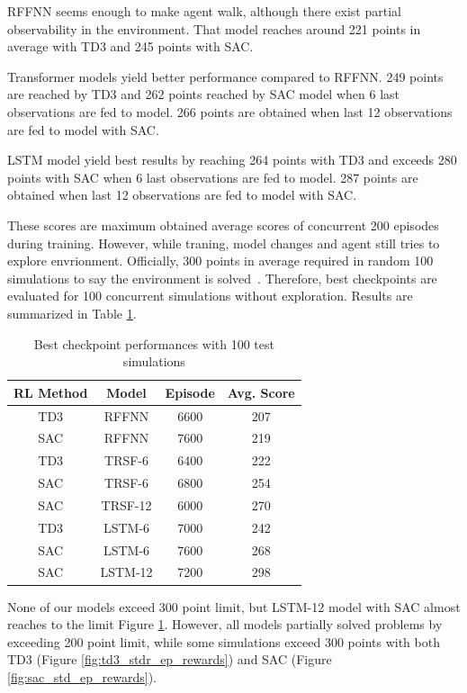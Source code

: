 \documentclass[a4paper, 12pt]{article} %
\begin{document}
RFFNN seems enough to make agent walk, although there exist partial observability in the environment. 
That model reaches around 221 points in average with TD3 and 245 points with SAC. 

Transformer models yield better performance compared to RFFNN. 249 points are reached by TD3 and 262 points reached by SAC model when 6 last observations are fed to model. 266 points are obtained when last 12 observations are fed to model with SAC.

LSTM model yield best results by reaching 264 points with TD3 and exceeds 280 points with SAC when 6 last observations are fed to model. 287 points are obtained when last 12 observations are fed to model with SAC. 

These scores are maximum obtained average scores of concurrent 200 episodes during training. 
However, while traning, model changes and agent still tries to explore envrionment. 
Officially, 300 points in average required in random 100 simulations to say the environment is solved~\cite{noauthor_gymleaderboard_2021}.
Therefore, best checkpoints are evaluated for 100 concurrent simulations without exploration. 
Results are summarized in Table \ref{table:ckpt_performance}.

\begin{table}
	\begin{center}
		\caption{Best checkpoint performances with 100 test simulations}
		\begin{tabular}{||c c c c||} 
			\hline
			RL Method & Model & Episode & Avg. Score \\ [0.5ex] 
			\hline\hline
			TD3 & RFFNN & 6600 & 207 \\ 
			\hline
			SAC & RFFNN & 7600 & 219 \\
			\hline
			TD3 & TRSF-6 & 6400 & 222 \\
			\hline
			SAC & TRSF-6 & 6800 & 254 \\
			\hline
			SAC & TRSF-12 & 6000 & 270 \\
			\hline
			TD3 & LSTM-6 & 7000 & 242 \\
			\hline
			SAC & LSTM-6 & 7600 & 268 \\
			\hline
			SAC & LSTM-12 & 7200 & 298 \\ [1ex] 
			\hline
		\end{tabular}
		\label{table:ckpt_performance}
	\end{center}
\end{table}

None of our models exceed 300 point limit, but LSTM-12 model with SAC almost reaches to the limit Figure \ref{table:ckpt_performance}. 
However, all models partially solved problems by exceeding 200 point limit, while some simulations exceed 300 points with both TD3 (Figure \ref{fig:td3_stdr_ep_rewards}) and SAC (Figure \ref{fig:sac_std_ep_rewards}). 
\end{document}
